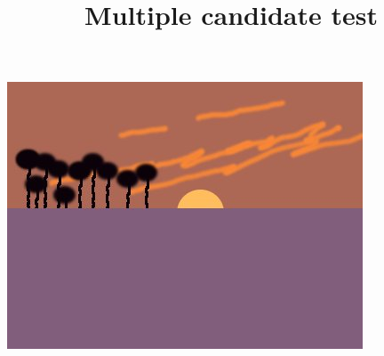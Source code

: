 \documentclass{article}
\title{Multiple candidate test}
\begin{document}
\includegraphics{sunset,encoded}
\end{document}
